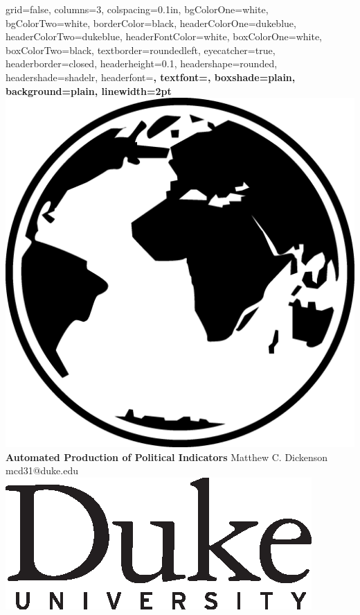 \documentclass[landscape, paperwidth=42in, paperheight=36in,
fontscale=.35, margin=1in]{baposter}
\begin{document}
\begin{poster}{ 
  grid=false,
  columns=3,
  colspacing=0.1in, 
  bgColorOne=white,
  bgColorTwo=white,
  borderColor=black,
  headerColorOne=dukeblue, %
  headerColorTwo=dukeblue, %
  headerFontColor=white,
  boxColorOne=white,
  boxColorTwo=black, %
  textborder=roundedleft,
  eyecatcher=true,
  headerborder=closed,
  headerheight=0.1\textheight,
  headershape=rounded, 
  headershade=shadelr,
  headerfont=\Large\bf\textsf, %
  textfont={\setlength{\parindent}{1.5em}},
  boxshade=plain,
  background=plain,
  linewidth=2pt
  } {%
	\hspace{1.3in} 
        \includegraphics[scale=0.05]{../graphics/Globe_Icon.png}
} {%
\textsf{
	\bf{Automated Production of Political Indicators}}
} { %
	\vspace{1em} \textsf{Matthew C. Dickenson}\\
	{\smaller \textsf{mcd31@duke.edu}}
} {%
  \centering \includegraphics[scale=.8]{dukelogo_vert_black.eps} \hspace{1in}
}



\end{poster}
\end{document}
